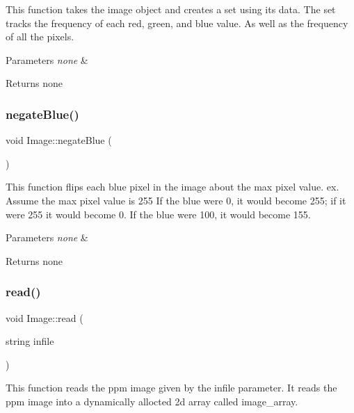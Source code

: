 This function takes the image object and creates a set using its data. The set tracks the frequency of each red, green, and blue value. As well as the frequency of all the pixels.


\begin{DoxyParams}{Parameters}
{\em none} & \\
\hline
\end{DoxyParams}
\begin{DoxyReturn}{Returns}
none 
\end{DoxyReturn}
\mbox{\label{class_image_a47f12bc0bd85a51e20cd12a514a9411a}} 
\subsubsection{\texorpdfstring{negate\+Blue()}{negateBlue()}}
{\footnotesize\ttfamily void Image\+::negate\+Blue (\begin{DoxyParamCaption}{ }\end{DoxyParamCaption})}

This function flips each blue pixel in the image about the max pixel value. ex. Assume the max pixel value is 255 If the blue were 0, it would become 255; if it were 255 it would become 0. If the blue were 100, it would become 155.


\begin{DoxyParams}{Parameters}
{\em none} & \\
\hline
\end{DoxyParams}
\begin{DoxyReturn}{Returns}
none 
\end{DoxyReturn}
\mbox{\label{class_image_afd7841c2016dc76156a43cc4cd348680}} 
\subsubsection{\texorpdfstring{read()}{read()}}
{\footnotesize\ttfamily void Image\+::read (\begin{DoxyParamCaption}\item[{string}]{infile }\end{DoxyParamCaption})}

This function reads the ppm image given by the infile parameter. It reads the ppm image into a dynamically allocted 2d array called image\+\_\+array.


